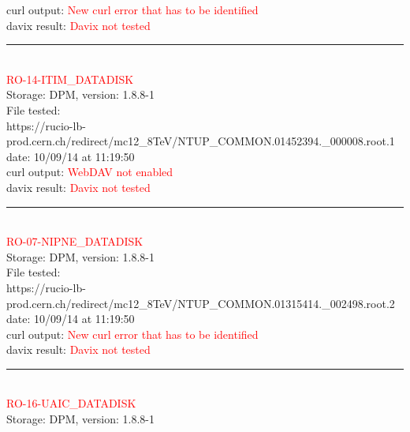 curl output:  \textcolor{red}{New curl error that has to be identified}\\

davix result:  \textcolor{red}{Davix not tested}\\

\rule{\textwidth}{1pt}\\

\textcolor{red}{\normalsize{RO-14-ITIM\_DATADISK}}\\

Storage: DPM, version: 1.8.8-1\\

File tested:\\
\footnotesize{https://rucio-lb-prod.cern.ch/redirect/mc12\_8TeV/NTUP\_COMMON.01452394.\_000008.root.1}\\

date: 10/09/14 at 11:19:50\\

curl output:  \textcolor{red}{WebDAV not enabled}\\

davix result:  \textcolor{red}{Davix not tested}\\

\rule{\textwidth}{1pt}\\

\textcolor{red}{\normalsize{RO-07-NIPNE\_DATADISK}}\\

Storage: DPM, version: 1.8.8-1\\

File tested:\\
\footnotesize{https://rucio-lb-prod.cern.ch/redirect/mc12\_8TeV/NTUP\_COMMON.01315414.\_002498.root.2}\\

date: 10/09/14 at 11:19:50\\

curl output:  \textcolor{red}{New curl error that has to be identified}\\

davix result:  \textcolor{red}{Davix not tested}\\

\rule{\textwidth}{1pt}\\

\textcolor{red}{\normalsize{RO-16-UAIC\_DATADISK}}\\

Storage: DPM, version: 1.8.8-1\\

